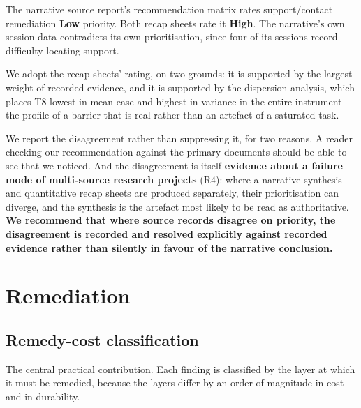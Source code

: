 \documentclass[]{interact}
\theoremstyle{plain}
\begin{document}
The narrative source report's recommendation matrix rates support/contact remediation \textbf{Low}
priority. Both recap sheets rate it \textbf{High}. The narrative's own session data contradicts its own
prioritisation, since four of its sessions record difficulty locating support.

We adopt the recap sheets' rating, on two grounds: it is supported by the largest weight of recorded
evidence, and it is supported by the dispersion analysis, which places T8 lowest in mean ease and
highest in variance in the entire instrument --- the profile of a barrier that is real rather than an
artefact of a saturated task.

We report the disagreement rather than suppressing it, for two reasons. A reader checking our
recommendation against the primary documents should be able to see that we noticed. And the
disagreement is itself \textbf{evidence about a failure mode of multi-source research projects} (R4):
where a narrative synthesis and quantitative recap sheets are produced separately, their prioritisation
can diverge, and the synthesis is the artefact most likely to be read as authoritative. \textbf{We
recommend that where source records disagree on priority, the disagreement is recorded and resolved
explicitly against recorded evidence rather than silently in favour of the narrative conclusion.}

\section{Remediation}
\label{sec:remed}

\subsection{Remedy-cost classification}

The central practical contribution. Each finding is classified by the layer at which it must be
remedied, because the layers differ by an order of magnitude in cost and in durability.
\end{document}
